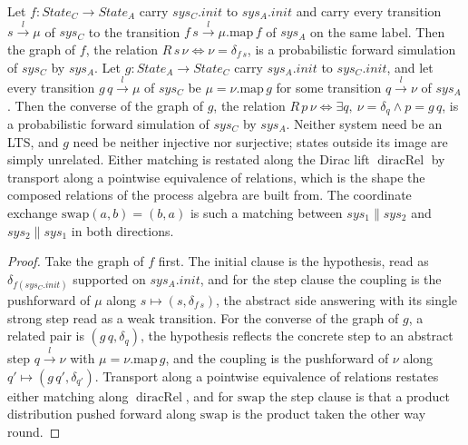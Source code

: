 \begin{lemma}
  \label{def:strongfunctional}
  \leanok
  Let $f : State_C \to State_A$ carry $sys_C.init$ to $sys_A.init$ and carry every transition $s \xrightarrow{l} \mu$ of $sys_C$ to the transition $f\,s \xrightarrow{l} \mu.\mathrm{map}\,f$ of $sys_A$ on the same label.
  Then the graph of $f$, the relation $R\,s\,\nu \iff \nu = \delta_{f\,s}$, is a probabilistic forward simulation of $sys_C$ by $sys_A$.
  Let $g : State_A \to State_C$ carry $sys_A.init$ to $sys_C.init$, and let every transition $g\,q \xrightarrow{l} \mu$ of $sys_C$ be $\mu = \nu.\mathrm{map}\,g$ for some transition $q \xrightarrow{l} \nu$ of $sys_A$.
  Then the converse of the graph of $g$, the relation $R\,p\,\nu \iff \exists q,\ \nu = \delta_q \wedge p = g\,q$, is a probabilistic forward simulation of $sys_C$ by $sys_A$.
  Neither system need be an LTS, and $g$ need be neither injective nor surjective; states outside its image are simply unrelated.
  Either matching is restated along the Dirac lift $\operatorname{diracRel}$ by transport along a pointwise equivalence of relations, which is the shape the composed relations of the process algebra are built from.
  The coordinate exchange $\mathrm{swap}(a,b) = (b,a)$ is such a matching between $sys_1 \parallel sys_2$ and $sys_2 \parallel sys_1$ in both directions.
\end{lemma}

\begin{proof}\leanok
  Take the graph of $f$ first.
  The initial clause is the hypothesis, read as $\delta_{f(sys_C.init)}$ supported on $sys_A.init$, and for the step clause the coupling is the pushforward of $\mu$ along $s \mapsto (s, \delta_{f\,s})$, the abstract side answering with its single strong step read as a weak transition.
  For the converse of the graph of $g$, a related pair is $(g\,q, \delta_q)$, the hypothesis reflects the concrete step to an abstract step $q \xrightarrow{l} \nu$ with $\mu = \nu.\mathrm{map}\,g$, and the coupling is the pushforward of $\nu$ along $q' \mapsto (g\,q', \delta_{q'})$.
  Transport along a pointwise equivalence of relations restates either matching along $\operatorname{diracRel}$, and for $\mathrm{swap}$ the step clause is that a product distribution pushed forward along $\mathrm{swap}$ is the product taken the other way round.
\end{proof}
